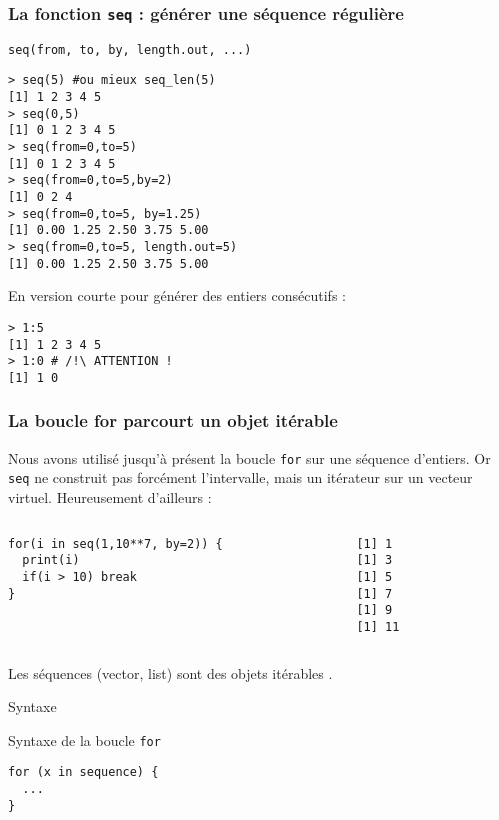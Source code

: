 \documentclass[10pt]{beamer}
\begin{document}
\begin{frame}[fragile]
  \frametitle{  La fonction \texttt{seq} : générer une séquence régulière}
  \begin{center}
    \alert{\texttt{seq(from, to, by, length.out, ...)}}
  \end{center}

\begin{lstlisting}
> seq(5) #ou mieux seq_len(5)
[1] 1 2 3 4 5
> seq(0,5)
[1] 0 1 2 3 4 5
> seq(from=0,to=5)
[1] 0 1 2 3 4 5
> seq(from=0,to=5,by=2)
[1] 0 2 4
> seq(from=0,to=5, by=1.25)
[1] 0.00 1.25 2.50 3.75 5.00
> seq(from=0,to=5, length.out=5)
[1] 0.00 1.25 2.50 3.75 5.00
\end{lstlisting}

En version courte pour générer des entiers consécutifs :
\begin{lstlisting}
> 1:5
[1] 1 2 3 4 5
> 1:0 # /!\ ATTENTION !
[1] 1 0
\end{lstlisting}
\end{frame}



\begin{frame}[fragile]
  \frametitle{La boucle for parcourt un objet itérable}

  Nous avons utilisé jusqu'à présent la boucle \texttt{for} sur une séquence d’entiers.
  Or \texttt{seq} ne construit pas forcément l'intervalle, mais un itérateur sur un vecteur virtuel.
  Heureusement d'ailleurs :
\begin{columns}[t]
\begin{column}{0.58\textwidth}
  \begin{lstlisting}[style=editor]
for(i in seq(1,10**7, by=2)) {
  print(i)
  if(i > 10) break
}
  \end{lstlisting}
\end{column}
\begin{column}{0.38\textwidth}
  \begin{lstlisting}
[1] 1
[1] 3
[1] 5
[1] 7
[1] 9
[1] 11
  \end{lstlisting}
\end{column}
\end{columns}

Les séquences (vector, list) sont des objets itérables .
\begin{block}{Syntaxe}

\end{block}{Syntaxe de la boucle \texttt{for}}
\begin{lstlisting}[style=edblock]
for (x in sequence) {
  ...
}
\end{lstlisting}

\end{frame}
\end{document}

